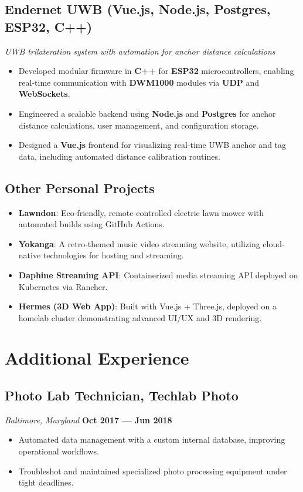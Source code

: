 \documentclass[a4paper,10pt]{article}
\begin{document}
\subsection*{Endernet UWB (Vue.js, Node.js, Postgres, ESP32, C++)}
\textit{UWB trilateration system with automation for anchor distance calculations}
\begin{itemize}[leftmargin=1.5em]
    \item Developed modular firmware in \textbf{C++} for \textbf{ESP32} microcontrollers, enabling real-time communication with \textbf{DWM1000} modules via \textbf{UDP} and \textbf{WebSockets}.
    \item Engineered a scalable backend using \textbf{Node.js} and \textbf{Postgres} for anchor distance calculations, user management, and configuration storage.
    \item Designed a \textbf{Vue.js} frontend for visualizing real-time UWB anchor and tag data, including automated distance calibration routines.
\end{itemize}

\subsection*{Other Personal Projects}
\begin{itemize}[leftmargin=1.5em]
    \item \textbf{Lawndon}: Eco-friendly, remote-controlled electric lawn mower with automated builds using GitHub Actions.
    \item \textbf{Yokanga}: A retro-themed music video streaming website, utilizing cloud-native technologies for hosting and streaming.
    \item \textbf{Daphine Streaming API}: Containerized media streaming API deployed on Kubernetes via Rancher.
    \item \textbf{Hermes (3D Web App)}: Built with Vue.js + Three.js, deployed on a homelab cluster demonstrating advanced UI/UX and 3D rendering.
\end{itemize}

\section*{Additional Experience}

\subsection*{Photo Lab Technician, Techlab Photo}
\textit{Baltimore, Maryland} \hfill \textbf{Oct 2017 — Jun 2018}
\begin{itemize}[leftmargin=1.5em]
    \item Automated data management with a custom internal database, improving operational workflows.
    \item Troubleshot and maintained specialized photo processing equipment under tight deadlines.
\end{itemize}
\end{document}
